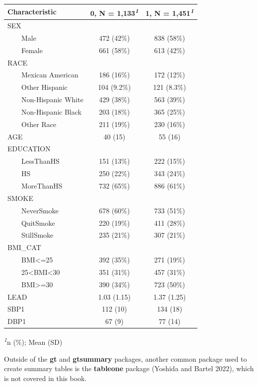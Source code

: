 \documentclass[
  letterpaper,
]{krantz}
\begin{document}
\setlength{\LTpost}{0mm}
\begin{longtable*}{lcc}
\toprule
\textbf{Characteristic} & \textbf{0}, N = 1,133\textsuperscript{\textit{1}} & \textbf{1}, N = 1,451\textsuperscript{\textit{1}} \\ 
\midrule
SEX &  &  \\ 
    Male & 472 (42\%) & 838 (58\%) \\ 
    Female & 661 (58\%) & 613 (42\%) \\ 
RACE &  &  \\ 
    Mexican American & 186 (16\%) & 172 (12\%) \\ 
    Other Hispanic & 104 (9.2\%) & 121 (8.3\%) \\ 
    Non-Hispanic White & 429 (38\%) & 563 (39\%) \\ 
    Non-Hispanic Black & 203 (18\%) & 365 (25\%) \\ 
    Other Race & 211 (19\%) & 230 (16\%) \\ 
AGE & 40 (15) & 55 (16) \\ 
EDUCATION &  &  \\ 
    LessThanHS & 151 (13\%) & 222 (15\%) \\ 
    HS & 250 (22\%) & 343 (24\%) \\ 
    MoreThanHS & 732 (65\%) & 886 (61\%) \\ 
SMOKE &  &  \\ 
    NeverSmoke & 678 (60\%) & 733 (51\%) \\ 
    QuitSmoke & 220 (19\%) & 411 (28\%) \\ 
    StillSmoke & 235 (21\%) & 307 (21\%) \\ 
BMI\_CAT &  &  \\ 
    BMI<=25 & 392 (35\%) & 271 (19\%) \\ 
    25<BMI<30 & 351 (31\%) & 457 (31\%) \\ 
    BMI>=30 & 390 (34\%) & 723 (50\%) \\ 
LEAD & 1.03 (1.15) & 1.37 (1.25) \\ 
SBP1 & 112 (10) & 134 (18) \\ 
DBP1 & 67 (9) & 77 (14) \\ 
\bottomrule
\end{longtable*}
\begin{minipage}{\linewidth}
\textsuperscript{\textit{1}}n (\%); Mean (SD)\\
\end{minipage}

Outside of the \textbf{gt} and \textbf{gtsummary} packages, another
common package used to create summary tables is the \textbf{tableone}
package (Yoshida and Bartel 2022), which is not covered in this book.
\end{document}
